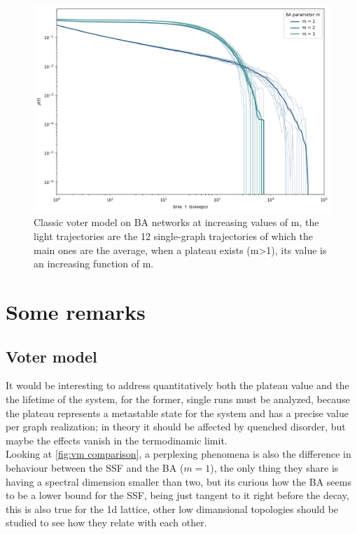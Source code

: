 \begin{appendices}
\begin{figure}[htbp]
\end{figure}
\begin{figure}[htbp]
  \centering
  \includegraphics[width=14cm,keepaspectratio]{images/BA_classic.png}
  \caption{Classic voter model on BA networks at increasing values of m, the light trajectories are the 12 single-graph trajectories of which the main ones are the average, when a plateau exists (m>1), its value is an increasing function of m.}
  
\end{figure}


\chapter{Some remarks}
\section{Voter model}
It would be interesting to address quantitatively both the plateau value and the the lifetime of the system, for the former, single runs must be analyzed, because the plateau represents a metastable state for the system and has a precise value per graph realization; in theory it should be affected by quenched disorder, but maybe the effects vanish in the termodinamic limit.\\
Looking at  \ref{fig:vm comparison}, a perplexing phenomena is also the difference in behaviour between the SSF and the BA ($m=1$), the only thing they share is having a spectral dimension smaller than two, but its curious how the BA seems to be a lower bound for the SSF, being just tangent to it right before the decay, this is also true for the 1d lattice, other low dimansional topologies should be studied to see how they relate with each other.\\


\end{appendices}
